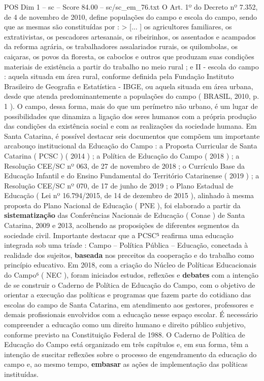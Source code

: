 \begin{textsample}{POS Dim 1 – sc – Score 84.00 – sc/sc\_em\_76.txt}
O Art. 1º do Decreto nº 7.352, de 4 de novembro de 2010, define populações do campo e escola do campo, sendo que as mesmas são constituídas por : > [... ] os agricultores familiares, os extrativistas, os pescadores artesanais, os ribeirinhos, os assentados e acampados da reforma agrária, os trabalhadores assalariados rurais, os quilombolas, os caiçaras, os povos da floresta, os caboclos e outros que produzam suas condições materiais de existência a partir do trabalho no meio rural ; e II - escola do campo : aquela situada em área rural, conforme definida pela Fundação Instituto Brasileiro de Geografia e Estatística - IBGE, ou aquela situada em área urbana, desde que atenda predominantemente a populações do campo ( BRASIL, 2010, p. 1 ).
O campo, dessa forma, mais do que um perímetro não urbano, é um lugar de possibilidades que dinamiza a ligação dos seres humanos com a própria produção das condições da existência social e com as realizações da sociedade humana.
Em Santa Catarina, é possível destacar seis documentos que compõem um importante arcabouço institucional da Educação do Campo : a Proposta Curricular de Santa Catarina ( PCSC ) ( 2014 ) ; a Política de Educação do Campo ( 2018 ) ; a Resolução CEE/SC nº 063, de 27 de novembro de 2018 ; o Currículo Base da Educação Infantil e do Ensino Fundamental do Território Catarinense ( 2019 ) ; a Resolução CEE/SC nº 070, de 17 de junho de 2019 ; o Plano Estadual de Educação ( Lei nº 16.794/2015, de 14 de dezembro de 2015 ), alinhado à mesma proposta do Plano Nacional de Educação ( PNE ), foi elaborado a partir da \textbf{sistematização} das Conferências Nacionais de Educação ( Conae ) de Santa Catarina, 2009 e 2013, acolhendo as proposições de diferentes segmentos da sociedade civil.
Importante destacar que a PCSC⁵ reafirma uma educação integrada sob uma tríade : Campo – Política Pública – Educação, conectada à realidade dos sujeitos, \textbf{baseada} nos preceitos da cooperação e do trabalho como princípio educativo.
Em 2018, com a criação do Núcleo de Políticas Educacionais do Campo⁶ ( NEC ), foram iniciados estudos, reflexões e \textbf{debates} com a intenção de se construir o Caderno de Política de Educação do Campo, com o objetivo de orientar a execução das políticas e programas que fazem parte do cotidiano das escolas do campo de Santa Catarina, em atendimento aos gestores, professores e demais profissionais envolvidos com a educação nesse espaço escolar.
É necessário compreender a educação como um direito humano e direito público subjetivo, conforme previsto na Constituição Federal de 1988.
O Caderno de Política de Educação do Campo está organizado em três capítulos e, em sua forma, têm a intenção de suscitar reflexões sobre o processo de engendramento da educação do campo e, ao mesmo tempo, \textbf{embasar} as ações de implementação das políticas instituídas.

\end{textsample}
